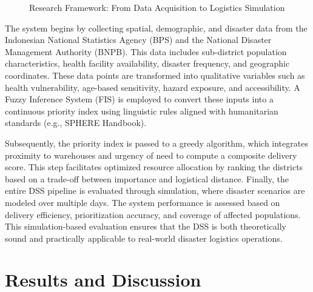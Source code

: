 \documentclass[conference,final,a4paper,twoside,10pt]{IEEEtran}
\begin{document}
\begin{figure}[htbp]
\centering
{}
\caption{Research Framework: From Data Acquisition to Logistics Simulation}
\label{fig:research_framework}
\end{figure}

The system begins by collecting spatial, demographic, and disaster data from the Indonesian National Statistics Agency (BPS) and the National Disaster Management Authority (BNPB). This data includes sub-district population characteristics, health facility availability, disaster frequency, and geographic coordinates.
These data points are transformed into qualitative variables such as health vulnerability, age-based sensitivity, hazard exposure, and accessibility. A Fuzzy Inference System (FIS) is employed to convert these inputs into a continuous priority index using linguistic rules aligned with humanitarian standards (e.g., SPHERE Handbook).

Subsequently, the priority index is passed to a greedy algorithm, which integrates proximity to warehouses and urgency of need to compute a composite delivery score. This step facilitates optimized resource allocation by ranking the districts based on a trade-off between importance and logistical distance.
Finally, the entire DSS pipeline is evaluated through simulation, where disaster scenarios are modeled over multiple days. The system performance is assessed based on delivery efficiency, prioritization accuracy, and coverage of affected populations. This simulation-based evaluation ensures that the DSS is both theoretically sound and practically applicable to real-world disaster logistics operations.


\section{Results and Discussion}
\end{document}
